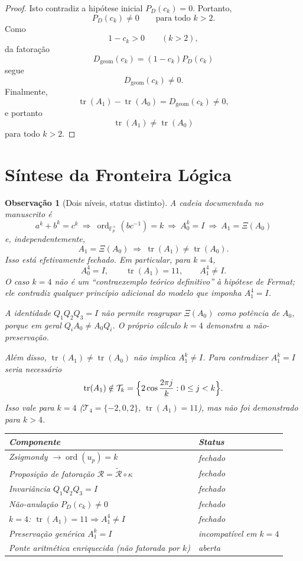 \documentclass[11pt,a4paper]{article}
\newtheorem{observacao}[teorema]{Observação}
\begin{document}
\begin{proof}
Isto contradiz a hipótese inicial $P_D(c_k)=0$. Portanto,
\[
P_D(c_k)\neq0\qquad\text{para todo }k>2.
\]
Como
\[
1-c_k>0\qquad(k>2),
\]
da fatoração
\[
D_{\mathrm{geom}}(c_k)=(1-c_k)P_D(c_k)
\]
segue
\[
D_{\mathrm{geom}}(c_k)\neq0.
\]
Finalmente,
\[
\operatorname{tr}(A_1)-\operatorname{tr}(A_0)=D_{\mathrm{geom}}(c_k)\neq0,
\]
e portanto
\[
\operatorname{tr}(A_1)\neq\operatorname{tr}(A_0)
\]
para todo $k>2$.
\end{proof}

\section{Síntese da Fronteira Lógica}

\begin{observacao}[Dois níveis, status distinto]
A cadeia documentada no manuscrito é
\[
a^k+b^k=c^k
\ \Longrightarrow\
\operatorname{ord}_{\mathbb{F}_p^\times}(bc^{-1})=k
\ \Longrightarrow\
A_0^k=I
\ \Longrightarrow\
A_1=\Xi(A_0)
\]
e, independentemente,
\[
A_1=\Xi(A_0)
\ \Longrightarrow\
\operatorname{tr}(A_1)\neq\operatorname{tr}(A_0).
\]
Isso está efetivamente fechado. Em particular, para \(k=4\),
\[
A_0^4=I,\qquad\operatorname{tr}(A_1)=11,\qquad A_1^4\neq I.
\]
O caso \(k=4\) não é um ``contraexemplo teórico definitivo'' à hipótese de Fermat; ele contradiz qualquer princípio adicional do modelo que imponha \(A_1^4=I\).

A identidade \(Q_1Q_2Q_3=I\) \emph{não} permite reagrupar \(\Xi(A_0)\) como potência de \(A_0\), porque em geral \(Q_iA_0\neq A_0Q_i\). O próprio cálculo \(k=4\) demonstra a não-preservação.

Além disso, \(\operatorname{tr}(A_1)\neq\operatorname{tr}(A_0)\) não implica \(A_1^k\neq I\). Para contradizer \(A_1^k=I\) seria necessário
\[
\operatorname{tr}(A_1)\notin\mathcal{T}_k=\Bigl\{2\cos\frac{2\pi j}{k}:0\le j<k\Bigr\}.
\]
Isso vale para \(k=4\) (\(\mathcal{T}_4=\{-2,0,2\}\), \(\operatorname{tr}(A_1)=11\)), mas não foi demonstrado para \(k>4\).

\begin{center}
\begin{tabular}{@{}lp{9.0cm}@{}}
\hline
Componente & Status \\
\hline
Zsigmondy $\to\operatorname{ord}(u_p)=k$ & fechado \\
Proposição de fatoração $\mathcal{R}=\widetilde{\mathcal{R}}\circ\kappa$ & fechado \\
Invariância $Q_1Q_2Q_3=I$ & fechado \\
Não-anulação $P_D(c_k)\neq0$ & fechado \\
$k=4$: $\operatorname{tr}(A_1)=11\Rightarrow A_1^4\neq I$ & fechado \\
Preservação genérica $A_1^k=I$ & incompatível em $k=4$ \\
Ponte aritmética enriquecida (não fatorada por $k$) & aberta \\
\hline
\end{tabular}
\end{center}


\end{observacao}
\end{document}
